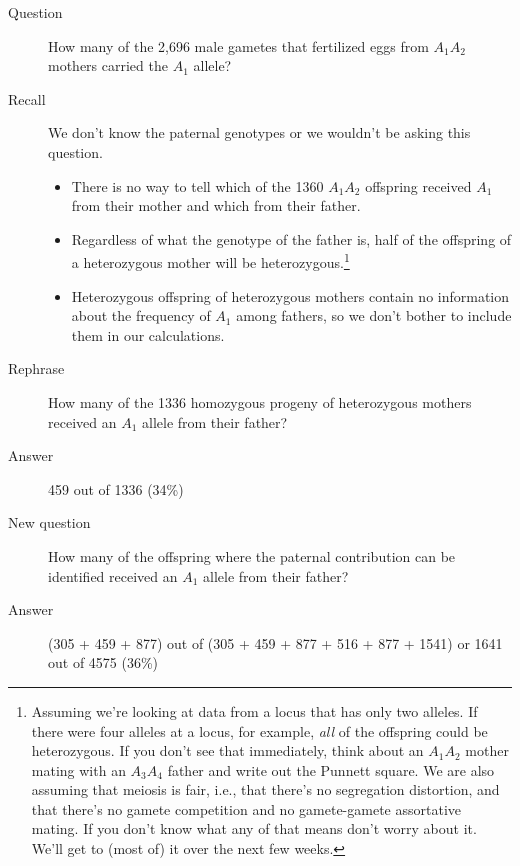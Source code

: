 \begin{description}

\item[Question] How many of the 2,696 male gametes that fertilized
eggs from $A_1A_2$ mothers carried the $A_1$ allele?

\item[Recall] We don't know the paternal genotypes or we wouldn't be
asking this question.

\begin{itemize}

\item There is no way to tell which of the 1360 $A_1A_2$ offspring
  received $A_1$ from their mother and which from their father.

\item Regardless of what the genotype of the father is, half of the
  offspring of a heterozygous mother will be
  heterozygous.\footnote{Assuming we're looking at data from a locus
    that has only two alleles. If there were four alleles at a locus,
    for example, {\it all\/} of the offspring could be
    heterozygous. If you don't see that immediately, think about an
    $A_1A_2$ mother mating with an $A_3A_4$ father and write out the
    Punnett square. We are also assuming that meiosis is fair, i.e.,
    that there's no segregation distortion, and that there's no gamete
    competition and no gamete-gamete assortative mating. If you don't
    know what any of that means don't worry about it. We'll get to
    (most of) it over the next few weeks.}

\item Heterozygous offspring of heterozygous mothers contain no
information about the frequency of $A_1$ among fathers, so we don't
bother to include them in our calculations.

\end{itemize}

\item[Rephrase] How many of the 1336 homozygous progeny of
heterozygous mothers received an $A_1$ allele from their father?

\item[Answer] 459 out of 1336 (34\%)

\item[New question] How many of the offspring where the paternal
contribution can be identified received an $A_1$ allele from their
father?

\item[Answer] (305 + 459 + 877) out of (305 + 459 + 877 + 516 + 877 +
1541) or 1641 out of 4575 (36\%)

\end{description}

